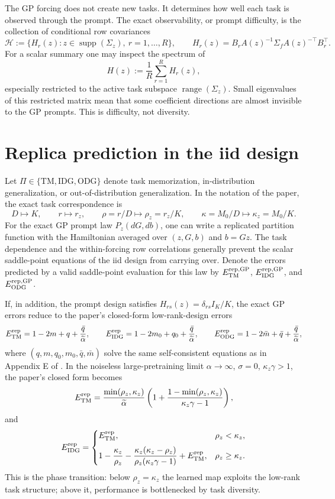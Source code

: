 \documentclass[11pt,a4paper]{article}
\theoremstyle{definition}
\begin{document}
The GP forcing does not create new tasks.  It determines how well each task is
observed through the prompt.  The exact observability, or prompt difficulty, is
the collection of conditional row covariances
\[
    \mathcal H
    :=
    \{H_r(z):z\in\operatorname{supp}(\Sigma_z),\ r=1,\ldots,R\},
    \qquad
    H_r(z)=B_rA(z)^{-1}\Sigma_fA(z)^{-\top}B_r^\top .
\]
For a scalar summary one may inspect the spectrum of
\[
    H(z):=\frac1R\sum_{r=1}^{R}H_r(z),
\]
especially restricted to the active task subspace
$\operatorname{range}(\Sigma_z)$.  Small eigenvalues of this restricted matrix
mean that some coefficient directions are almost invisible to the GP prompts.
This is difficulty, not diversity.

\section{Replica prediction in the iid design}

Let $\Pi\in\{\mathrm{TM},\mathrm{IDG},\mathrm{ODG}\}$ denote task
memorization, in-distribution generalization, or out-of-distribution
generalization.  In the notation of the paper, the exact task correspondence is
\[
    D\mapsto K,
    \qquad
    r\mapsto r_z,
    \qquad
    \rho=r/D\mapsto \rho_z=r_z/K,
    \qquad
    \kappa=M_0/D\mapsto \kappa_z=M_0/K .
\]
For the exact GP prompt law $P_z(dG,db)$, one can write a replicated
partition function with the Hamiltonian averaged over $(z,G,b)$ and $b=Gz$.
The task dependence and the within-forcing row correlations generally prevent
the scalar saddle-point equations of the iid design from carrying over.
Denote the errors predicted by a valid saddle-point evaluation for this law by
$E_{\rm TM}^{\rm rep,GP}$, $E_{\rm IDG}^{\rm rep,GP}$, and
$E_{\rm ODG}^{\rm rep,GP}$.

If, in addition, the prompt design satisfies
\(H_{rs}(z)=\delta_{rs}I_K/K\), the exact GP errors reduce to the paper's
closed-form
low-rank-design errors
\[
    E_{\rm TM}^{\rm rep}
    =
    1-2m+q+\frac{\bar q}{\widetilde\alpha},
    \qquad
    E_{\rm IDG}^{\rm rep}
    =
    1-2m_0+q_0+\frac{\bar q}{\widetilde\alpha},
    \qquad
    E_{\rm ODG}^{\rm rep}
    =
    1-2\bar m+\bar q+\frac{\bar q}{\widetilde\alpha},
\]
where $(q,m,q_0,m_0,\bar q,\bar m)$ solve the same self-consistent equations
as in Appendix E of \cite{takanami2026lowrankicl}.  In the noiseless
large-pretraining limit $\alpha\to\infty$, $\sigma=0$, $\kappa_z\gamma>1$,
the paper's closed form becomes
\[
E_{\rm TM}^{\rm rep}
=
\frac{\min(\rho_z,\kappa_z)}{\widetilde\alpha}
\left(
1+\frac{1-\min(\rho_z,\kappa_z)}{\kappa_z\gamma-1}
\right),
\]
and
\[
E_{\rm IDG}^{\rm rep}
=
\begin{cases}
E_{\rm TM}^{\rm rep}, & \rho_z<\kappa_z,\\[2mm]
1-\dfrac{\kappa_z}{\rho_z}
-\dfrac{\kappa_z(\kappa_z-\rho_z)}
        {\rho_z(\kappa_z\gamma-1)}
+E_{\rm TM}^{\rm rep}, & \rho_z\ge \kappa_z .
\end{cases}
\]
This is the phase transition: below $\rho_z=\kappa_z$ the learned map exploits
the low-rank task structure; above it, performance is bottlenecked by task
diversity.
\end{document}
